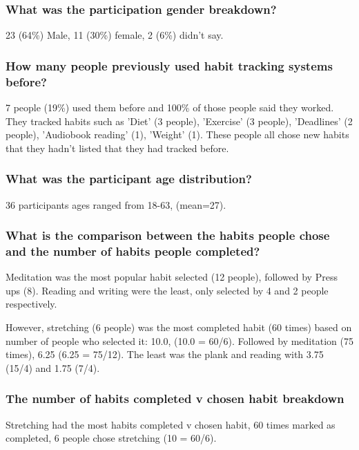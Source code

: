 \subsubsection*{What was the participation gender breakdown?}
23 (64\%) Male, 11 (30\%) female, 2 (6\%) didn't say.


\subsubsection*{How many people previously used habit tracking systems before?}
7 people (19\%) used them before and 100\% of those people said they worked. They tracked habits such as 'Diet' (3 people), 'Exercise' (3 people), 'Deadlines' (2 people), 'Audiobook reading' (1), 'Weight' (1). These people all chose new habits that they hadn't listed that they had tracked before.


\subsubsection*{What was the participant age distribution?}
36 participants ages ranged from 18-63, (mean=27).

\subsubsection*{What is the comparison between the habits people chose and the number of habits people completed?}
Meditation was the most popular habit selected (12 people), followed by Press ups (8). Reading and writing were the least, only selected by 4 and 2 people respectively.

However, stretching (6 people) was the most completed habit (60 times) based on number of people who selected it: 10.0, (10.0 = 60/6). Followed by meditation (75 times), 6.25 (6.25 = 75/12). The least was the plank and reading with 3.75 (15/4) and 1.75 (7/4).

\subsubsection*{The number of habits completed v chosen habit breakdown}
Stretching had the most habits completed v chosen habit, 60 times marked as completed, 6 people chose stretching (10 = 60/6).



